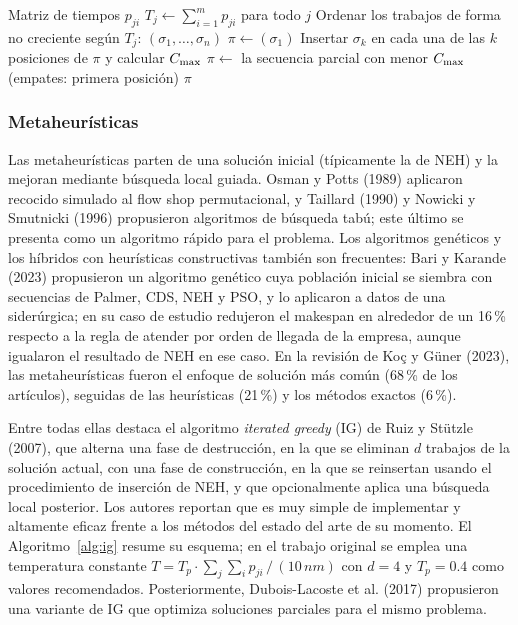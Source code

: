 \begin{algorithm}[htbp]
\caption{Heurística NEH}\label{alg:neh}
\begin{algorithmic}[1]
\Require Matriz de tiempos $p_{ji}$
\State $T_j \gets \sum_{i=1}^m p_{ji}$ para todo $j$
\State Ordenar los trabajos de forma no creciente según $T_j$: $(\sigma_1,\ldots,\sigma_n)$
\State $\pi \gets (\sigma_1)$
  \State Insertar $\sigma_k$ en cada una de las $k$ posiciones de $\pi$ y calcular $C_{\max}$
  \State $\pi \gets$ la secuencia parcial con menor $C_{\max}$ (empates: primera posición)
\EndFor
\State \Return $\pi$
\end{algorithmic}
\end{algorithm}

\subsubsection{Metaheurísticas}

Las metaheurísticas parten de una solución inicial (típicamente la de NEH) y la mejoran
mediante búsqueda local guiada. Osman y Potts (1989) aplicaron recocido simulado al flow
shop permutacional, y Taillard (1990) y Nowicki y Smutnicki (1996) propusieron algoritmos
de búsqueda tabú; este último se presenta como un algoritmo rápido para el problema. Los
algoritmos genéticos y los híbridos con heurísticas constructivas también son frecuentes:
Bari y Karande (2023) propusieron un algoritmo genético cuya población inicial se siembra
con secuencias de Palmer, CDS, NEH y PSO, y lo aplicaron a datos de una siderúrgica; en
su caso de estudio redujeron el makespan en alrededor de un 16\,\% respecto a la regla
de atender por orden de llegada de la empresa, aunque igualaron el resultado de NEH en ese
caso. En la revisión de Koç y Güner (2023), las metaheurísticas fueron el enfoque de
solución más común (68\,\% de los artículos), seguidas de las heurísticas (21\,\%) y los
métodos exactos (6\,\%).

Entre todas ellas destaca el algoritmo \textit{iterated greedy} (IG) de Ruiz y Stützle
(2007), que alterna una fase de destrucción, en la que se eliminan $d$ trabajos de la
solución actual, con una fase de construcción, en la que se reinsertan usando el
procedimiento de inserción de NEH, y que opcionalmente aplica una búsqueda local posterior.
Los autores reportan que es muy simple de implementar y altamente eficaz frente a los
métodos del estado del arte de su momento. El Algoritmo~\ref{alg:ig} resume su esquema;
en el trabajo original se emplea una temperatura constante
$T=T_p\cdot\sum_{j}\sum_{i}p_{ji}\,/\,(10\,nm)$ con $d=4$ y $T_p=0.4$ como valores
recomendados. Posteriormente, Dubois-Lacoste et al. (2017) propusieron una variante de
IG que optimiza soluciones parciales para el mismo problema.


